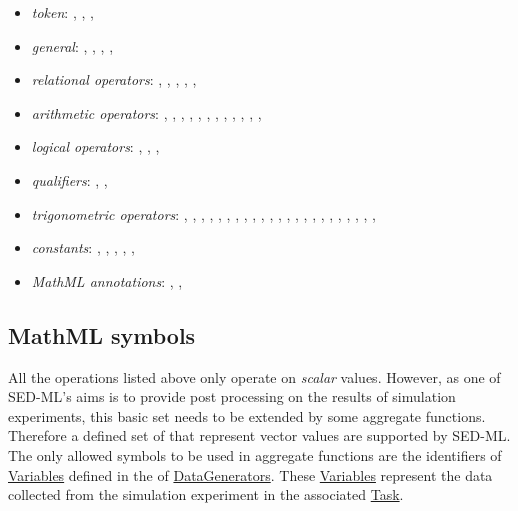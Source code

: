 \begin{itemize}\setlength{\parskip}{-0.1ex}

\item \emph{token}: , , ,
  
\item \emph{general}: , ,
  , ,  

\item \emph{relational operators}: , ,
  , , , 

\item \emph{arithmetic operators}: , ,
  , , , ,
  , , , ,
  , , 

\item \emph{logical operators}: , ,
  , 

\item \emph{qualifiers}: , ,

\item \emph{trigonometric operators}: , ,
  , , , ,
  , , , ,
  , , , ,
  , , , ,
  , , ,
  , , 

\item \emph{constants}: , ,
  , , ,

\item \emph{MathML annotations}: ,
  , 
\end{itemize}


\subsection{MathML symbols}
All the operations listed above only operate on \emph{scalar} values. However, as one of SED-ML's aims is to provide post processing on the results of simulation experiments, this basic set needs to be extended by some aggregate functions. Therefore a defined set of  that represent vector values are supported by SED-ML. The only allowed symbols to be used in aggregate functions are the identifiers of \hyperref[class:variable]{Variables} defined in the \hyperref[sec:listOfVariables]{} of \hyperref[class:dataGenerator]{DataGenerators}. These \hyperref[class:variable]{Variables} represent the data collected from the simulation experiment in the associated \hyperref[class:task]{Task}. 


